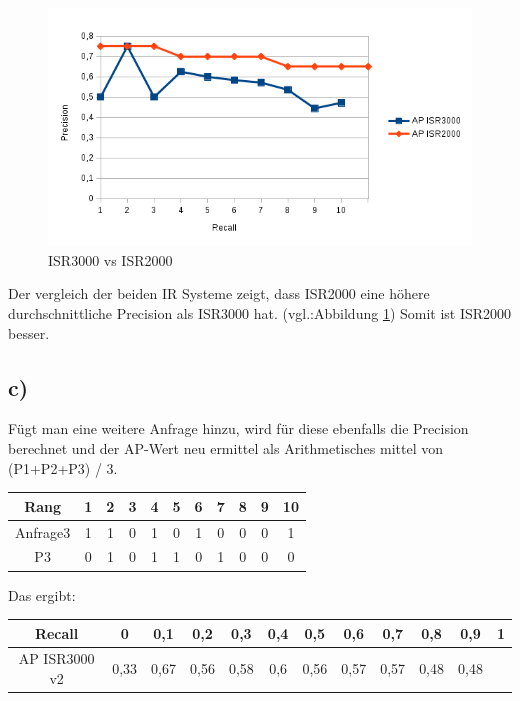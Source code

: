 \begin{figure}[H]
\centering
\includegraphics[width=0.7\linewidth]{./Aufgabe2/ir3vsir2}
\caption{ISR3000 vs ISR2000}
\label{fig:ir3vsir2}
\end{figure}

Der vergleich der beiden IR Systeme zeigt, dass ISR2000 eine höhere durchschnittliche Precision als ISR3000 hat. (vgl.:Abbildung \ref{fig:ir3vsir2})
Somit ist ISR2000 besser.

\subsection*{c)}
Fügt man eine weitere Anfrage hinzu, wird für diese ebenfalls die Precision berechnet und der AP-Wert neu ermittel als Arithmetisches mittel von (P1+P2+P3) / 3.
\begin{center}
\begin{tabular}{|c|c|c|c|c|c|c|c|c|c|c|}
\hline Rang 	& 1 & 2  & 3  & 4  & 5  & 6  & 7  & 8  & 9  & 10 \\ 
\hline Anfrage3 & 1 & 1  & 0  & 1  & 0  & 1  & 0  & 0  & 0  & 1  \\ 
\hline P3 & 0 & 1  & 0  & 1  & 1  & 0  & 1  & 0  & 0  & 0 \\ 
\hline
\end{tabular}
\end{center}
Das ergibt:\\
\begin{center}
\begin{tabular}{|c|c|c|c|c|c|c|c|c|c|c|c|}
\hline Recall 	  & 0    & 0,1  &  0,2 & 0,3 & 0,4 & 0,5 & 0,6 & 0,7  & 0,8  & 0,9  & 1 \\
\hline AP ISR3000 v2 & 0,33 & 0,67 & 0,56 & 0,58 & 0,6 & 0,56 & 0,57 & 0,57 & 0,48 & 0,48 & \\
\hline
\end{tabular}
\end{center}
\newpage